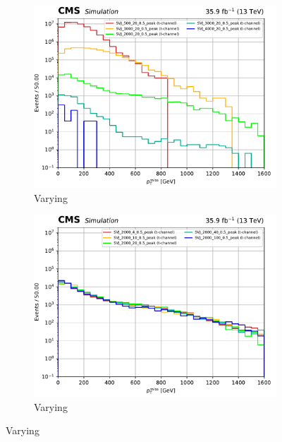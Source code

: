\begin{figure}[htbp]
    \centering
    \begin{subfigure}[b]{0.48\textwidth}
        \includegraphics[width=\textwidth]{figures/t_channel_benchmark_variations/mPhi.pdf}
        \caption{Varying \mBifund}
    \end{subfigure}
    \hfill
    \begin{subfigure}[b]{0.48\textwidth}
        \includegraphics[width=\textwidth]{figures/t_channel_benchmark_variations/mD.pdf}
        \caption{Varying \mDark}
    \end{subfigure}


\end{figure}
